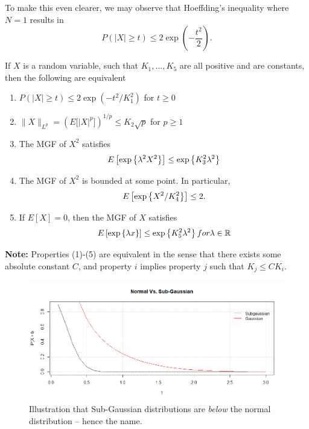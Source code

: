 To make this even clearer, we may observe that Hoeffding's inequality where $N=1$ results in 
$$ P\left( \left|X \right| \geq t\right) \leq 2\exp\left( -\frac{t^2}{2} \right). $$

\begin{tcolorbox}
\begin{proposition}
If $X$ is a random variable, such that $K_1, ..., K_5$ are all positive and are constants, then the following are equivalent 
    \begin{enumerate}
    \item $\displaystyle{ P\left( |X| \geq t \right) \leq 2 \exp\left( -t^2/K_1^2 \right) }$ for $t \geq 0$
    \item $\displaystyle{ \|X\|_{L^p} = \left( E\big[|X|^p\big] \right)^{1/p} \leq K_2\sqrt{p}}$ for $p \geq 1$
    \item The MGF of $X^2$ satisfies
    $$ E\left[\exp\left\{\lambda^2 X^2 \right\} \right] \leq \exp\left\{K_3^2 \lambda^2 \right\} $$
    \item The MGF of $X^2$ is bounded at some point. In particular,
    $$ E\left[\exp\left\{X^2/ K_4^2 \right\} \right] \leq 2. $$ 
    \item If $E[X] = 0$, then the MGF of $X$ satisfies
    $$ E\left[\exp\left\{\lambda x \right\} \right] \leq \exp\left\{K_5^2 \lambda^2 \right\} for \lambda \in \mathbb{R}$$
    \end{enumerate}
\textbf{Note:} Properties (1)-(5) are equivalent in the sense that there exists some absolute constant $C$, and property $i$ implies property $j$ such that $K_j \leq C K_i. $
\label{prop:subgaussian}
\end{proposition}
\end{tcolorbox}


\begin{figure}[H]
        \centering
        \includegraphics[scale=0.6]{Normal_vs_SubGaussian}
        \caption{Illustration that Sub-Gaussian distributions are \textit{below} the normal distribution -- hence the name. }
\end{figure}

